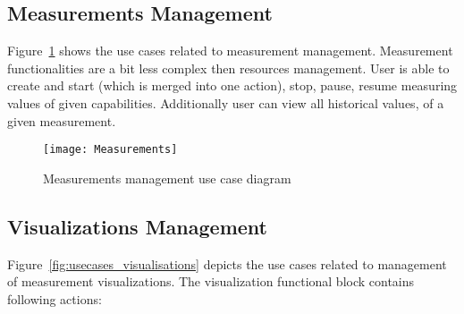 \subsection{Measurements Management}
\label{subsec:measurement_mgmnt}



Figure~\ref{fig:usecases_measurements} shows the use cases related to measurement management. Measurement functionalities are a bit less complex then resources management. User is able to create and start (which is merged into one action), stop, pause, resume measuring values of given capabilities. Additionally user can view all historical values, of a given measurement.

\begin{figure}[ht]
\centering
\texttt{[image: Measurements]}
\caption{Measurements management use case diagram}
\label{fig:usecases_measurements}
\end{figure}

\subsection{Visualizations Management}
\label{subsec:visualizations_mgmnt}

Figure~\ref{fig:usecases_visualisations} depicts the use cases related to management of measurement visualizations. The visualization functional block contains following actions:

